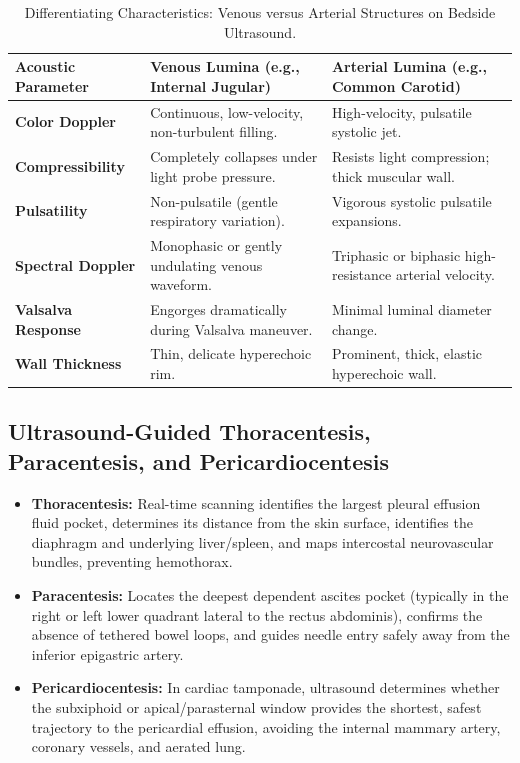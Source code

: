 \documentclass[11pt,a4paper]{article}
\begin{document}
\begin{table}[htbp]
\centering
\small
\setlength{\tabcolsep}{3.5pt}
\caption{Differentiating Characteristics: Venous versus Arterial Structures on Bedside Ultrasound.}
\label{tab:vein_vs_artery}
\begin{tabular}{p{3.2cm} p{5.8cm} p{5.8cm}}
\toprule
\textbf{Acoustic Parameter} & \textbf{Venous Lumina (e.g., Internal Jugular)} & \textbf{Arterial Lumina (e.g., Common Carotid)} \\
\midrule
\textbf{Color Doppler} & Continuous, low-velocity, non-turbulent filling. & High-velocity, pulsatile systolic jet. \\
\addlinespace
\textbf{Compressibility} & Completely collapses under light probe pressure. & Resists light compression; thick muscular wall. \\
\addlinespace
\textbf{Pulsatility} & Non-pulsatile (gentle respiratory variation). & Vigorous systolic pulsatile expansions. \\
\addlinespace
\textbf{Spectral Doppler} & Monophasic or gently undulating venous waveform. & Triphasic or biphasic high-resistance arterial velocity. \\
\addlinespace
\textbf{Valsalva Response} & Engorges dramatically during Valsalva maneuver. & Minimal luminal diameter change. \\
\addlinespace
\textbf{Wall Thickness} & Thin, delicate hyperechoic rim. & Prominent, thick, elastic hyperechoic wall. \\
\bottomrule
\end{tabular}
\end{table}

\subsection{Ultrasound-Guided Thoracentesis, Paracentesis, and Pericardiocentesis}
\begin{itemize}[leftmargin=2em]
    \item \textbf{Thoracentesis:} Real-time scanning identifies the largest pleural effusion fluid pocket, determines its distance from the skin surface, identifies the diaphragm and underlying liver/spleen, and maps intercostal neurovascular bundles, preventing hemothorax.
    \item \textbf{Paracentesis:} Locates the deepest dependent ascites pocket (typically in the right or left lower quadrant lateral to the rectus abdominis), confirms the absence of tethered bowel loops, and guides needle entry safely away from the inferior epigastric artery.
    \item \textbf{Pericardiocentesis:} In cardiac tamponade, ultrasound determines whether the subxiphoid or apical/parasternal window provides the shortest, safest trajectory to the pericardial effusion, avoiding the internal mammary artery, coronary vessels, and aerated lung.
\end{itemize}
\end{document}
